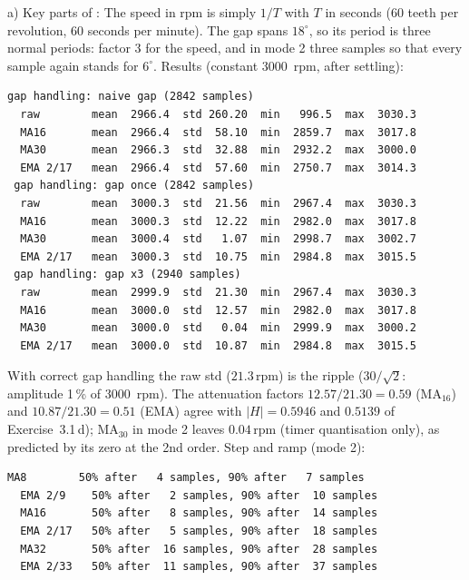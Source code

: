 \begin{solution}
a) Key parts of :
The speed in rpm is simply $1/T$ with $T$ in seconds ($60$ teeth per
revolution, 60 seconds per minute). The gap spans $18^\circ$, so its period is
three normal periods: factor 3 for the speed, and in mode 2 three samples so
that every sample again stands for $6^\circ$.
Results (constant \SI{3000}{rpm}, after settling):
\begin{lstlisting}[style=shell,numbers=none]
 gap handling: naive gap (2842 samples)
  raw        mean  2966.4  std 260.20  min   996.5  max  3030.3
  MA16       mean  2966.4  std  58.10  min  2859.7  max  3017.8
  MA30       mean  2966.3  std  32.88  min  2932.2  max  3000.0
  EMA 2/17   mean  2966.4  std  57.60  min  2750.7  max  3014.3
 gap handling: gap once (2842 samples)
  raw        mean  3000.3  std  21.56  min  2967.4  max  3030.3
  MA16       mean  3000.3  std  12.22  min  2982.0  max  3017.8
  MA30       mean  3000.4  std   1.07  min  2998.7  max  3002.7
  EMA 2/17   mean  3000.3  std  10.75  min  2984.8  max  3015.5
 gap handling: gap x3 (2940 samples)
  raw        mean  2999.9  std  21.30  min  2967.4  max  3030.3
  MA16       mean  3000.0  std  12.57  min  2982.0  max  3017.8
  MA30       mean  3000.0  std   0.04  min  2999.9  max  3000.2
  EMA 2/17   mean  3000.0  std  10.87  min  2984.8  max  3015.5
\end{lstlisting}
With correct gap handling the raw std ($21.3$\,rpm) is the ripple
($30/\sqrt2$: amplitude 1\,\% of \SI{3000}{rpm}). The attenuation factors
$12.57/21.30=0.59$ (MA$_{16}$) and $10.87/21.30=0.51$ (EMA) agree with
$|H|=0.5946$ and $0.5139$ of Exercise~3.1\,d);
MA$_{30}$ in mode 2 leaves $0.04$\,rpm (timer quantisation only), as predicted
by its zero at the 2nd order.
Step and ramp (mode 2):
\begin{lstlisting}[style=shell,numbers=none]
  MA8        50% after   4 samples, 90% after   7 samples
  EMA 2/9    50% after   2 samples, 90% after  10 samples
  MA16       50% after   8 samples, 90% after  14 samples
  EMA 2/17   50% after   5 samples, 90% after  18 samples
  MA32       50% after  16 samples, 90% after  28 samples
  EMA 2/33   50% after  11 samples, 90% after  37 samples


\end{lstlisting}
\end{solution}
